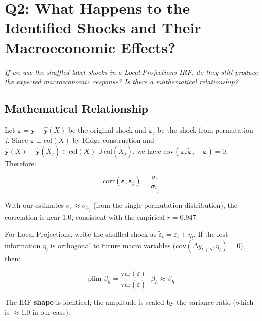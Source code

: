 \documentclass[11pt,a4paper]{article}
\begin{document}
\section*{Q2: What Happens to the Identified Shocks and Their Macroeconomic Effects?}

\textit{If we use the shuffled-label shocks in a Local Projections IRF, do they still produce the expected macroeconomic response? Is there a mathematical relationship?}

\subsection*{Mathematical Relationship}

Let $\boldsymbol{\varepsilon} = \mathbf{y} - \hat{\mathbf{y}}(X)$ be the original shock and $\tilde{\boldsymbol{\varepsilon}}_j$ be the shock from permutation $j$. Since $\boldsymbol{\varepsilon} \perp \text{col}(X)$ by Ridge construction and $\hat{\mathbf{y}}(X) - \hat{\mathbf{y}}(\tilde{X}_j) \in \text{col}(X) \cup \text{col}(\tilde{X}_j)$, we have $\text{cov}(\boldsymbol{\varepsilon}, \tilde{\boldsymbol{\varepsilon}}_j - \boldsymbol{\varepsilon}) = 0$. Therefore:

\begin{equation}
\text{corr}(\boldsymbol{\varepsilon}, \tilde{\boldsymbol{\varepsilon}}_j) = \frac{\sigma_\varepsilon}{\sigma_{\tilde{\varepsilon}_j}}
\end{equation}

With our estimates $\sigma_\varepsilon \approx \sigma_{\tilde{\varepsilon}_j}$ (from the single-permutation distribution), the correlation is near 1.0, consistent with the empirical $r = 0.947$.

For Local Projections, write the shuffled shock as $\tilde{\varepsilon}_t = \varepsilon_t + \eta_t$. If the lost information $\eta_t$ is orthogonal to future macro variables ($\text{cov}(\Delta y_{t+h}, \eta_t) = 0$), then:

\begin{equation}
\text{plim } \tilde{\beta}_h = \frac{\text{var}(\varepsilon)}{\text{var}(\tilde{\varepsilon})} \cdot \beta_h \approx \beta_h
\end{equation}

The IRF \textbf{shape} is identical; the amplitude is scaled by the variance ratio (which is $\approx 1.0$ in our case).
\end{document}
